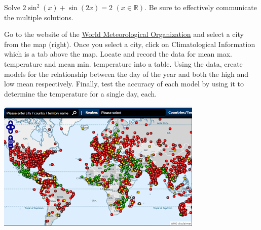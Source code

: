 \documentclass[12pt]{book}
\begin{document}
\begin{enumerate}
\newpage


\item Solve $2\sin^2(x) + \sin(2x) = 2$ $(x \in \mathbb{R})$. Be sure to effectively communicate the multiple solutions.


\newpage

\begin{minipage}{4in}
\item Go to the website of the \href{http://worldweather.wmo.int/}{World Meteorological Organization} and select a city from the map (right).
Once you select a city, click on Climatological Information which is a tab above the map. Locate and record the data for mean max. temperature and mean min. temperature into a table. Using the data, create models for the relationship between the day of the year and both the high and low mean respectively. Finally, test the accuracy of each model by using it to determine the temperature for a single day, each.
\end{minipage}\hspace{0.2in}
\begin{minipage}{1in}
\includegraphics[scale=0.75]{WorldMap.png}
\end{minipage}

\newpage


\end{enumerate}
\end{document}
